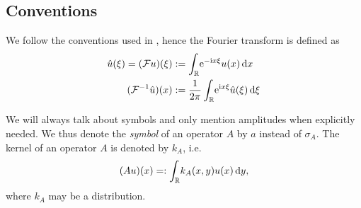 \subsection{Conventions}
We follow the conventions used in \cite{Les:PDO}, hence the Fourier transform is
defined as
\begin{align*}
  \hat{u}(\xi) = (\mathcal{F}u)(\xi)
    &:= \Integ{\mathbb{R}}{x}{\Eto{-\mathrm ix\xi} u(x)} \\
  (\mathcal{F}^{-1}\hat{u})(x) &:=
  \frac{1}{2\pi}\Integ{\mathbb{R}}{\xi}{\Eto{\mathrm ix\xi}
    \hat{u}(\xi)}
\end{align*}

We will always talk about symbols and only mention amplitudes when explicitly
needed. We thus denote the \emph{symbol} of an operator $A$ by $a$ instead of
$\sigma_A$. The kernel of an operator $A$ is denoted by $k_A$, i.e.\ 
\begin{align*}
  (Au)(x) =: \Integ{\mathbb{R}}{y}{k_A(x,y) u(x)},
\end{align*}
where $k_A$ may be a distribution.
